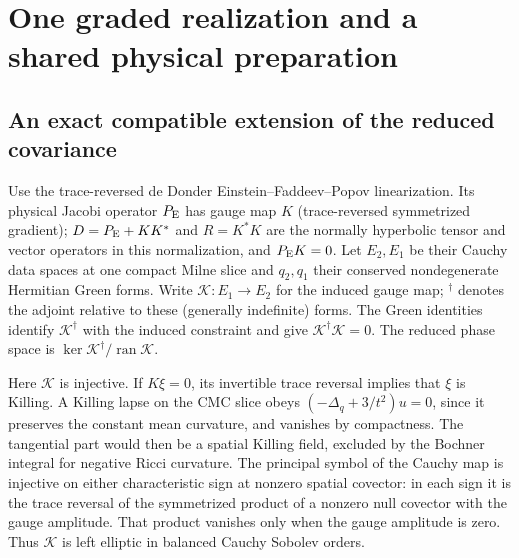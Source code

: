 \section{One graded realization and a shared physical preparation}\label{sec:state}

\subsection{An exact compatible extension of the reduced covariance}

Use the trace-reversed de Donder Einstein--Faddeev--Popov linearization. Its physical Jacobi operator \(P_{\rm E}\) has gauge map \(K\) (trace-reversed symmetrized gradient); \(D=P_{\rm E}+KK^*\) and \(R=K^*K\) are the normally hyperbolic tensor and vector operators in this normalization, and \(P_{\rm E}K=0\). Let \(E_2,E_1\) be their Cauchy data spaces at one compact Milne slice and \(q_2,q_1\) their conserved nondegenerate Hermitian Green forms. Write \(\mathcal K:E_1\to E_2\) for the induced gauge map; \(^{\dagger}\) denotes the adjoint relative to these (generally indefinite) forms. The Green identities identify \(\mathcal K^\dagger\) with the induced constraint and give \(\mathcal K^\dagger\mathcal K=0\). The reduced phase space is \(\ker\mathcal K^\dagger/\operatorname{ran}\mathcal K\).

Here \(\mathcal K\) is injective. If \(K\xi=0\), its invertible trace reversal implies that \(\xi\) is Killing. A Killing lapse on the CMC slice obeys \((-\Delta_q+3/t^2)u=0\), since it preserves the constant mean curvature, and vanishes by compactness. The tangential part would then be a spatial Killing field, excluded by the Bochner integral for negative Ricci curvature. The principal symbol of the Cauchy map is injective on either characteristic sign at nonzero spatial covector: in each sign it is the trace reversal of the symmetrized product of a nonzero null covector with the gauge amplitude. That product vanishes only when the gauge amplitude is zero. Thus \(\mathcal K\) is left elliptic in balanced Cauchy Sobolev orders.

